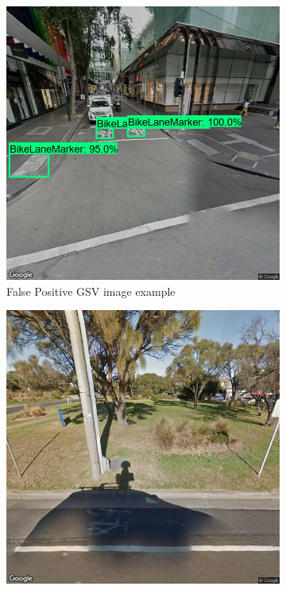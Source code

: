 \documentclass[11pt,twoside]{report}
\begin{document}
\begin{figure}[h]
\centering
\begin{subfigure}{0.3\textwidth}
	\includegraphics[width=\textwidth]{V2_8000_FP1.jpg}
	\caption{False Positive GSV image example}
	\label{rq3c-a}
\end{subfigure}
\hfill
\begin{subfigure}{0.3\textwidth}
	\includegraphics[width=\textwidth]{V2_8000_FN1.jpg}

\end{subfigure}
\end{figure}
\end{document}
